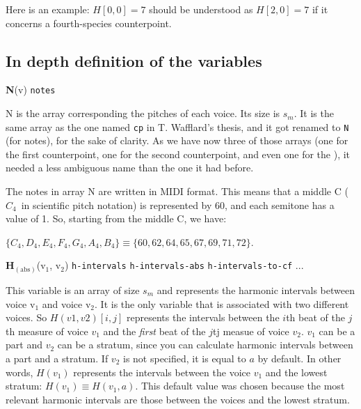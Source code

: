Here is an example: $H[0, 0] = 7$ should be understood as $H[2, 0] = 7$ if it concerns a fourth-species counterpoint.

\subsection{In depth definition of the variables} \label{section:definition-variables}

\noindent \textbf{N}(v) \hspace{.2cm} \texttt{notes} 

N is the array corresponding the pitches of each voice. Its size is $s_m$. It is the same array as the one named \texttt{cp} in T. Wafflard's thesis, and it got renamed to \texttt{N} (for notes), for the sake of clarity. As we have now three of those arrays (one for the first counterpoint, one for the second counterpoint, and even one for the \cf), it needed a less ambiguous name than the one it had before. 

The notes in array N are written in MIDI format. This means that a middle C ($C_4$~in scientific pitch notation) is represented by 60, and each semitone has a value of 1. So, starting from the middle C, we have:

$\{C_4, D_4, E_4, F_4, G_4, A_4, B_4\} \equiv \{60, 62, 64, 65, 67, 69, 71, 72\}$.




\vspace{.5cm} \noindent \textbf{H}$_{(\text{abs})}$(v$_1$, v$_2$) \hspace{.2cm} \texttt{h-intervals}\hspace{.2cm} \texttt{h-intervals-abs}\hspace{.2cm} \texttt{h-intervals-to-cf}\hspace{.2cm}  ...

This variable is an array of size $s_m$ and represents the harmonic intervals between voice v$_1$ and voice v$_2$. It is the only variable that is associated with two different voices. So $H(v1,v2)[i,j]$ represents the intervals between the $i$th beat of the $j$th measure of voice $v_1$ and the \textit{first} beat of the $j$tj measue of voice $v_2$. $v_1$ can be a part and $v_2$ can be a stratum, since you can calculate harmonic intervals between a part and a stratum. If $v_2$ is not specified, it is equal to $a$ by default. In other words, $H(v_1)$ represents the intervals between the voice $v_1$ and the lowest stratum: $H(v_1) \equiv H(v_1,a)$. This default value was chosen because the most relevant harmonic intervals are those between the voices and the lowest stratum.

